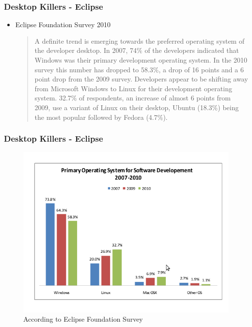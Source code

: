 \documentclass{beamer}
\begin{document}
\begin{frame} 
\frametitle{Desktop Killers - Eclipse}

\begin{itemize}
\item Eclipse Foundation Survey 2010

\begin{quote}
A definite trend is emerging towards the preferred operating system of the developer
desktop. In 2007, 74\% of the developers indicated that Windows was their primary
development operating system. In the 2010 survey this number has dropped to 58.3\%,
a drop of 16 points and a 6 point drop from the 2009 survey. Developers appear to be
shifting away from Microsoft Windows to Linux for their development operating system.
32.7\% of respondents, an increase of almost 6 points from 2009, use a variant of Linux
on their desktop, Ubuntu (18.3\%) being the most popular followed by Fedora (4.7\%).
\end{quote}
\end{itemize}

\end{frame}
 

\begin{frame}
\frametitle{Desktop Killers - Eclipse}
\begin{figure}
 \includegraphics[scale=0.25]{figs/eclipse-os}
 \caption {According to Eclipse Foundation Survey}
\end{figure}
\end{frame}
\end{document}
